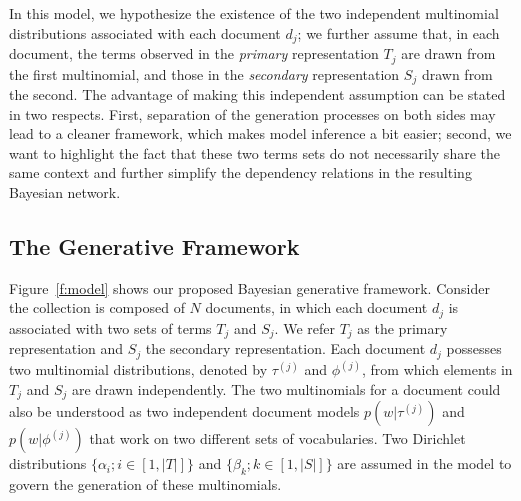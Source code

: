 In this model, we hypothesize the existence of the two independent multinomial
distributions associated with each document $d_j$; we further assume that, in
each document, the terms observed in the \emph{primary} representation $T_j$
are drawn from the first multinomial, and those in the \emph{secondary}
representation $S_j$ drawn from the second.  The advantage of making this
independent assumption can be stated in two respects.  First, separation of the
generation processes on both sides may lead to a cleaner framework, which makes
model inference a bit easier; second, we want to highlight the fact that these
two terms sets do not necessarily share the same context and further simplify
the dependency relations in the resulting Bayesian network.  

\subsection{The Generative Framework}

Figure~\ref{f:model} shows our proposed Bayesian generative framework.
Consider the collection is composed of $N$ documents, in which each document
$d_j$ is associated with two sets of terms $T_j$ and $S_j$.  We refer $T_j$ as
the primary representation and $S_j$ the secondary representation.  Each
document $d_j$ possesses two multinomial distributions, denoted by $\tau^{(j)}$
and $\phi^{(j)}$, from which elements in $T_j$ and $S_j$ are drawn
independently.  The two multinomials for a document could also be understood as
two independent document models $p(w|\tau^{(j)})$ and $p(w|\phi^{(j)})$ that
work on two different sets of vocabularies.  Two Dirichlet distributions
$\{\alpha_i; i \in [1, |T|]\}$ and $\{\beta_k; k \in [1, |S|]\}$ are assumed in
the model to govern the generation of these multinomials.  


